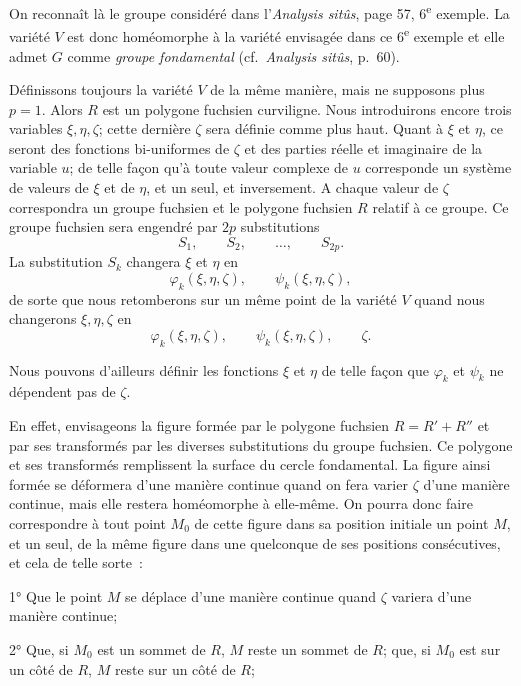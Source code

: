 \documentclass{article}
\begin{document}
On reconnaît là le groupe considéré dans l'\emph{Analysis sitûs}, page 57, 6\textsuperscript{e} exemple. La variété $V$ est donc homéomorphe à la variété envisagée dans ce 6\textsuperscript{e} exemple et elle admet $G$ comme \emph{groupe fondamental} (cf.\ \emph{Analysis sitûs}, p.\ 60).

Définissons toujours la variété $V$ de la même manière, mais ne supposons plus $p = 1$. Alors $R$ est un polygone fuchsien curviligne. Nous introduirons encore trois variables $\xi, \eta, \zeta$; cette dernière $\zeta$ sera définie comme plus haut. Quant à $\xi$ et $\eta$, ce seront des fonctions bi-uniformes de $\zeta$ et des parties réelle et imaginaire de la variable $u$; de telle façon qu'à toute valeur complexe de $u$ corresponde un système de valeurs de $\xi$ et de $\eta$, et un seul, et inversement. A chaque valeur de $\zeta$ correspondra un groupe fuchsien et le polygone fuchsien $R$ relatif à ce groupe. Ce groupe fuchsien sera engendré par $2p$ substitutions
\[ S_{1}, \qquad S_{2}, \qquad \ldots, \qquad S_{2p}. \]
La substitution $S_{k}$ changera $\xi$ et $\eta$ en
\[ \varphi_{k}(\xi, \eta, \zeta), \qquad \psi_{k}(\xi, \eta, \zeta), \]
de sorte que nous retomberons sur un même point de la variété $V$ quand nous changerons $\xi, \eta, \zeta$ en
\[ \varphi_{k}(\xi, \eta, \zeta), \qquad \psi_{k}(\xi, \eta, \zeta), \qquad \zeta. \]


Nous pouvons d'ailleurs définir les fonctions $\xi$ et $\eta$ de telle façon que $\varphi_{k}$ et $\psi_{k}$ ne dépendent pas de $\zeta$.

En effet, envisageons la figure formée par le polygone fuchsien $R = R' + R''$ et par ses transformés par les diverses substitutions du groupe fuchsien. Ce polygone et ses transformés remplissent la surface du cercle fondamental. La figure ainsi formée se déformera d'une manière continue quand on fera varier $\zeta$ d'une manière continue, mais elle restera homéomorphe à elle-même. On pourra donc faire correspondre à tout point $M_{0}$ de cette figure dans sa position initiale un point $M$, et un seul, de la même figure dans une quelconque de ses positions consécutives, et cela de telle sorte~:

1° Que le point $M$ se déplace d'une manière continue quand $\zeta$ variera d'une manière continue;

2° Que, si $M_{0}$ est un sommet de $R$, $M$ reste un sommet de $R$; que, si $M_{0}$ est sur un côté de $R$, $M$ reste sur un côté de $R$;
\end{document}
